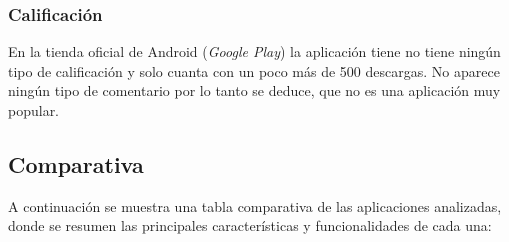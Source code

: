 \subsubsection{Calificación}
\label{subsec:calificacion_ourhome}
En la tienda oficial de Android (\textit{Google Play}) la aplicación tiene no tiene ningún tipo de calificación y solo cuanta con un poco más de 500 descargas. 
No aparece ningún tipo de comentario por lo tanto se deduce, que no es una aplicación muy popular. 


\subsection{Comparativa}
\label{sec:comparativa}

A continuación se muestra una tabla comparativa de las aplicaciones analizadas, donde se resumen las principales características y funcionalidades de cada una: 

\begin{table}[ht]
    \centering

\end{table}

